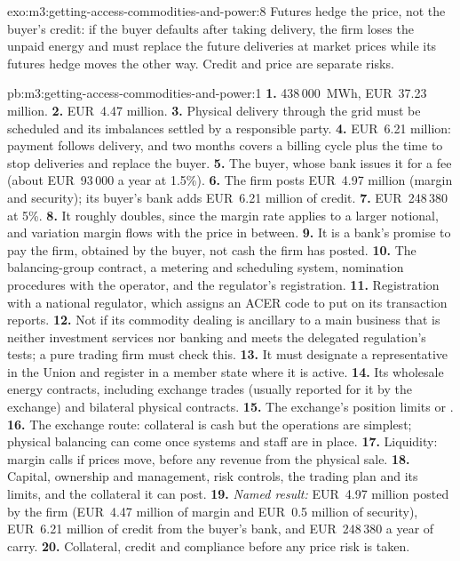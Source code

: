 \begin{solution}{exo:m3:getting-access-commodities-and-power:8}
Futures hedge the price, not the buyer's credit: if the buyer defaults after taking delivery, the firm loses
the unpaid energy and must replace the future deliveries at market prices while its futures hedge moves the
other way. Credit and price are separate risks.
\end{solution}

\begin{solution}{pb:m3:getting-access-commodities-and-power:1}
\textbf{1.} 438\,000~MWh, EUR~37.23 million. \textbf{2.} EUR~4.47 million. \textbf{3.} Physical delivery
through the grid must be scheduled and its imbalances settled by a responsible party. \textbf{4.} EUR~6.21
million: payment follows delivery, and two months covers a billing cycle plus the time to stop deliveries and
replace the buyer. \textbf{5.} The buyer, whose bank issues it for a fee (about EUR~93\,000 a year at 1.5\%).
\textbf{6.} The firm posts EUR~4.97 million (margin and security); its buyer's bank adds EUR~6.21 million of
credit. \textbf{7.} EUR~248\,380 at 5\%. \textbf{8.} It roughly doubles, since the margin rate applies to a
larger notional, and variation margin flows with the price in between. \textbf{9.} It is a bank's promise to pay
the firm, obtained by the buyer, not cash the firm has posted. \textbf{10.} The balancing-group contract, a
metering and scheduling system, nomination procedures with the operator, and the regulator's registration.
\textbf{11.} Registration with a national regulator, which assigns an ACER code to put on its transaction reports.
\textbf{12.} Not if its commodity dealing is ancillary to a main business that is neither investment services
nor banking and meets the delegated regulation's tests; a pure trading firm must check this. \textbf{13.} It must
designate a representative in the Union and register in a member state where it is active. \textbf{14.} Its
wholesale energy contracts, including exchange trades (usually reported for it by the exchange) and bilateral
physical contracts. \textbf{15.} The exchange's position limits or . \textbf{16.} The
exchange route: collateral is cash but the operations are simplest; physical balancing can come once systems
and staff are in place. \textbf{17.} Liquidity: margin calls if prices move, before any revenue from the
physical sale. \textbf{18.} Capital, ownership and management, risk controls, the trading plan and its limits,
and the collateral it can post. \textbf{19.} \emph{Named result:} EUR~4.97 million posted by the firm (EUR~4.47
million of margin and EUR~0.5 million of security), EUR~6.21 million of credit from the buyer's bank, and
EUR~248\,380 a year of carry. \textbf{20.} Collateral, credit and compliance before any price risk is taken.
\end{solution}


